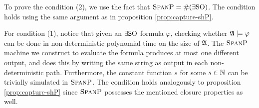 To prove the condition (2), we use the fact that $\text{\sc SpanP} = \#(\exists{\rm SO})$. The condition holds using the same argument as in proposition \ref{prop:capture-shP}.

For condition (1), notice that given an $\exists{\rm SO}$ formula $\varphi$, checking whether $\mathfrak{A}\models\varphi$ can be done in non-deterministic polynomial time on the size of $\mathfrak{A}$\cite{fagin1974generalized}. The $\text{\sc SpanP}$ machine we construct to evaluate the formula produces at most one different output, and does this by writing the same string as output in each non-deterministic path. Furthermore, the constant function $s$ for some $s\in\mathbb{N}$ can be trivially simulated in $\text{\sc SpanP}$. The condition holds analogously to proposition \ref{prop:capture-shP} since $\text{\sc SpanP}$ possesses the mentioned closure properties as well\cite{OH93}.

